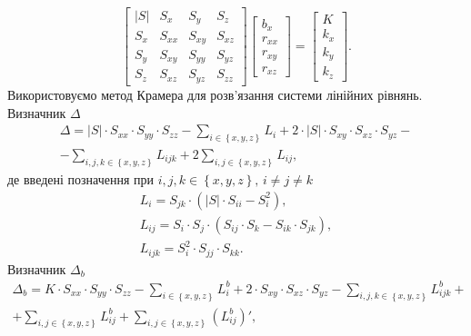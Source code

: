 \begin{equation*}
  \begin{bmatrix}
    \left| S \right| & S_x & S_y & S_z \\
    S_x & S_{xx} & S_{xy} & S_{xz} \\
    S_y & S_{xy} & S_{yy} & S_{yz} \\
    S_z & S_{xz} & S_{yz} & S_{zz}
  \end{bmatrix}
  \begin{bmatrix}
    b_x \\
    r_{xx} \\
    r_{xy} \\
    r_{xz}
  \end{bmatrix} =
  \begin{bmatrix}
    K \\
    k_x \\
    k_y \\
    k_z
  \end{bmatrix}.
\end{equation*}
Використовуємо метод Крамера для розв'язання системи лінійних рівнянь.
Визначник $ \Delta $
\begin{gather*}
  \Delta =
  \left| S \right| \cdot S_{xx} \cdot S_{yy} \cdot S_{zz} -
  \sum \limits_{i \in \left\{ x, y, z \right\} } L_i +
  2 \cdot \left| S \right| \cdot S_{xy} \cdot S_{xz} \cdot S_{yz} - \\
  - \sum \limits_{i, j, k \in \left\{ x, y, z \right\} } L_{ijk} +
  2 \sum \limits_{i, j \in \left\{ x, y, z \right\} } L_{ij},
\end{gather*}
де введені позначення при
$i, j, k \in \left\{ x, y, z \right\}, \, i \neq j \neq k$
\begin{gather*}
  L_i = S_{jk} \cdot \left( \left| S \right| \cdot S_{ii} - S_i^2 \right), \\
  L_{ij} = S_i \cdot S_j \cdot \left( S_{ij} \cdot S_k - S_{ik} \cdot S_{jk} \right), \\
  L_{ijk} = S_i^2 \cdot S_{jj} \cdot S_{kk}.
\end{gather*}
Визначник $ \Delta_{b}$
\begin{gather*}
  \Delta_b =
  K \cdot S_{xx} \cdot S_{yy} \cdot S_{zz} - \sum \limits_{i \in \left\{ x, y, z \right\} } L_i^b +
  2 \cdot S_{xy} \cdot S_{xz} \cdot S_{yz} -
  \sum \limits_{i, j, k \in \left\{ x, y, z \right\} } L_{ijk}^b + \\
  + \sum \limits_{i, j \in \left\{ x, y, z \right\} } L_{ij}^b +
  \sum \limits_{i, j \in \left\{ x, y, z \right\} } \left( L_{ij}^b \right)',
\end{gather*}
